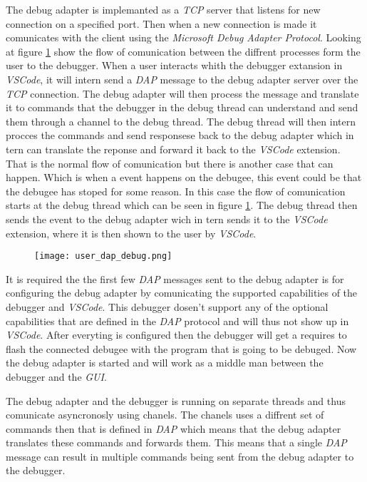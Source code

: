
The debug adapter is implemanted as a \emph{TCP} server that listens for new connection on a specified port.
Then when a new connection is made it comunicates with the client using the \emph{Microsoft Debug Adapter Protocol}.
Looking at figure \ref{fig:userDAP} show the flow of comunication between the diffrent processes form the user to the debugger.
When a user interacts whith the debugger extansion in \emph{VSCode}, it will intern send a \emph{DAP} message to the debug adapter server over the \emph{TCP} connection.
The debug adapter will then process the message and translate it to commands that the debugger in the debug thread can understand and send them through a channel to the debug thread.
The debug thread will then intern procces the commands and send responsese back to the debug adapter which in tern can translate the reponse and forward it back to the \emph{VSCode} extension.
That is the normal flow of comunication but there is another case that can happen.
Which is when a event happens on the debugee, this event could be that the debugee has stoped for some reason.
In this case the flow of comunication starts at the debug thread which can be seen in figure \ref{fig:userDAP}.
The debug thread then sends the event to the debug adapter wich in tern sends it to the \emph{VSCode} extension, where it is then shown to the user by \emph{VSCode}.


\begin{figure}[h]
    \centering
    \texttt{[image: user\_dap\_debug.png]}
    \label{fig:userDAP}
\end{figure}


It is required the the first few \emph{DAP} messages sent to the debug adapter is for configuring the debug adapter by comunicating the supported capabilities of the debugger and \emph{VSCode}.
This debugger dosen't support any of the optional capabilities that are defined in the \emph{DAP} protocol and will thus not show up in \emph{VSCode}.
After everyting is configured then the debugger will get a requires to flash the connected debugee with the program that is going to be debuged.
Now the debug adapter is started and will work as a middle man between the debugger and the \emph{GUI}.


The debug adapter and the debugger is running on separate threads and thus comunicate asyncronosly using chanels.
The chanels uses a diffrent set of commands then that is defined in \emph{DAP} which means that the debug adapter translates these commands and forwards them.
This means that a single \emph{DAP} message can result in multiple commands being sent from the debug adapter to the debugger.


